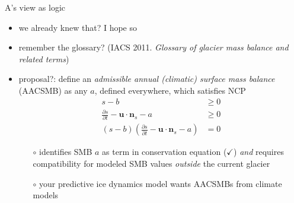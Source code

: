 \documentclass[10pt,hyperref,dvipsnames]{beamer}
\newcommand{\bn}{\mathbf{n}}
\newcommand{\bu}{\mathbf{u}}
\begin{document}
\begin{frame}{A's view as logic}
\begin{itemize}
\item we already knew that?  I hope so
\item remember the glossary?  \quad \scriptsize (IACS 2011. \emph{Glossary of glacier mass balance and related terms}) \normalsize
\item proposal?: define an \emph{admissible annual (climatic) surface mass balance} (AACSMB) as any $a$, defined everywhere, which satisfies NCP
\begin{align*}
s-b &\ge 0 \\
\frac{\partial s}{\partial t} - \bu \cdot \bn_s - a &\ge 0 \\
(s-b) \left(\frac{\partial s}{\partial t} - \bu \cdot \bn_s - a\right) &= 0
\end{align*}

\vspace{-2mm}
    \begin{itemize}
    \item[$\circ$] identifies SMB $a$ as term in conservation equation ($\checkmark$) \emph{and} requires compatibility for modeled SMB values \emph{outside} the current glacier
    \item[$\circ$] your predictive ice dynamics model wants AACSMBs from climate models
    \end{itemize}
\end{itemize}
\end{frame}
\end{document}
